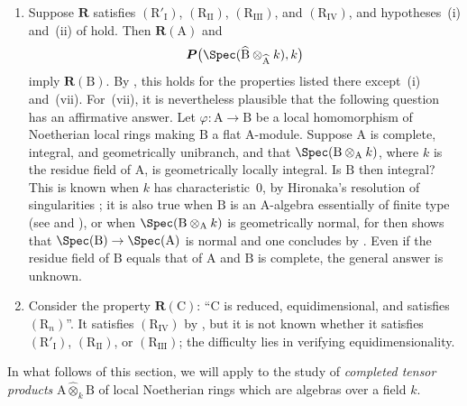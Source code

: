 \begin{remarks}[7.5.4]
\begin{enumerate}[label=(\roman*)]
  \item Suppose $\boldsymbol{R}$ satisfies $(\mathrm{R}'_{\mathrm{I}})$, $(\mathrm{R}_{\mathrm{II}})$, $(\mathrm{R}_{\mathrm{III}})$, and $(\mathrm{R}_{\mathrm{IV}})$, and hypotheses~(i) and~(ii) of  hold. Then $\boldsymbol{R}(\mathrm{A})$ and
  \[
    \boldsymbol{P}\bigl(\Spec(\widehat{\mathrm{B}}\otimes_{\widehat{\mathrm{A}}}k),k\bigr)
  \]
  imply $\boldsymbol{R}(\mathrm{B})$. By , this holds for the properties listed there except~(i) and~(vii). For~(vii), it is nevertheless plausible that the following question has an affirmative answer. Let $\varphi:\mathrm{A}\to\mathrm{B}$ be a local homomorphism of Noetherian local rings making $\mathrm{B}$ a flat $\mathrm{A}$-module. Suppose $\mathrm{A}$ is complete, integral, and geometrically unibranch, and that $\Spec(\mathrm{B}\otimes_\mathrm{A}k)$, where $k$ is the residue field of $\mathrm{A}$, is geometrically locally integral. Is $\mathrm{B}$ then integral? This is known when $k$ has characteristic~$0$, by Hironaka's resolution of singularities ; it is also true when $\mathrm{B}$ is an $\mathrm{A}$-algebra essentially of finite type  (see  and ), or when $\Spec(\mathrm{B}\otimes_\mathrm{A}k)$ is geometrically normal, for then  shows that $\Spec(\mathrm{B})\to\Spec(\mathrm{A})$ is normal and one concludes by . Even if the residue field of $\mathrm{B}$ equals that of $\mathrm{A}$ and $\mathrm{B}$ is complete, the general answer is unknown.

  \item Consider the property $\boldsymbol{R}(\mathrm{C})$: ``$\mathrm{C}$ is reduced, equidimensional, and satisfies $(\mathrm{R}_n)$''. It satisfies $(\mathrm{R}_{\mathrm{IV}})$ by , but it is not known whether it satisfies $(\mathrm{R}'_{\mathrm{I}})$, $(\mathrm{R}_{\mathrm{II}})$, or $(\mathrm{R}_{\mathrm{III}})$; the difficulty lies in verifying equidimensionality.
\end{enumerate}
\end{remarks}


In what follows of this section, we will apply  to the study of \emph{completed tensor products} $\mathrm{A}\widehat{\otimes}_k\mathrm{B}$ of local Noetherian rings which are algebras over a field $k$.


